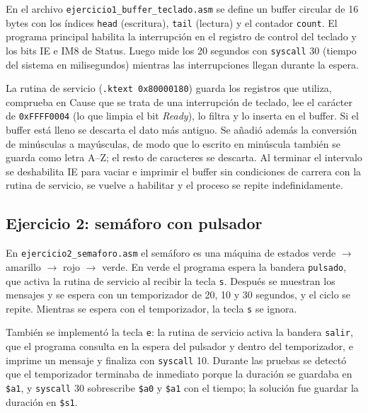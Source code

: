 \documentclass[11pt,a4paper]{article}
\begin{document}
En el archivo \texttt{ejercicio1\_buffer\_teclado.asm} se define un buffer circular de 16 bytes con los índices \texttt{head} (escritura), \texttt{tail} (lectura) y el contador \texttt{count}. El programa principal habilita la interrupción en el registro de control del teclado y los bits IE e IM8 de Status. Luego mide los 20 segundos con \texttt{syscall} 30 (tiempo del sistema en milisegundos) mientras las interrupciones llegan durante la espera.

La rutina de servicio (\texttt{.ktext 0x80000180}) guarda los registros que utiliza, comprueba en Cause que se trata de una interrupción de teclado, lee el carácter de \texttt{0xFFFF0004} (lo que limpia el bit \emph{Ready}), lo filtra y lo inserta en el buffer. Si el buffer está lleno se descarta el dato más antiguo. Se añadió además la conversión de minúsculas a mayúsculas, de modo que lo escrito en minúscula también se guarda como letra A--Z; el resto de caracteres se descarta. Al terminar el intervalo se deshabilita IE para vaciar e imprimir el buffer sin condiciones de carrera con la rutina de servicio, se vuelve a habilitar y el proceso se repite indefinidamente.



\subsection*{Ejercicio 2: semáforo con pulsador}

En \texttt{ejercicio2\_semaforo.asm} el semáforo es una máquina de estados verde $\rightarrow$ amarillo $\rightarrow$ rojo $\rightarrow$ verde. En verde el programa espera la bandera \texttt{pulsado}, que activa la rutina de servicio al recibir la tecla \texttt{s}. Después se muestran los mensajes y se espera con un temporizador de 20, 10 y 30 segundos, y el ciclo se repite. Mientras se espera con el temporizador, la tecla \texttt{s} se ignora.

También se implementó la tecla \texttt{e}: la rutina de servicio activa la bandera \texttt{salir}, que el programa consulta en la espera del pulsador y dentro del temporizador, e imprime un mensaje y finaliza con \texttt{syscall} 10. Durante las pruebas se detectó que el temporizador terminaba de inmediato porque la duración se guardaba en \texttt{\$a1}, y \texttt{syscall} 30 sobrescribe \texttt{\$a0} y \texttt{\$a1} con el tiempo; la solución fue guardar la duración en \texttt{\$s1}.


\end{document}
